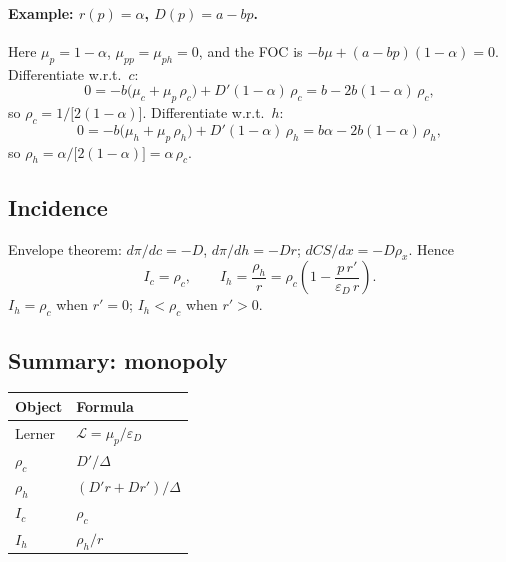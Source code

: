 \documentclass[11pt]{article}
\begin{document}
\paragraph{Example: $r(p)=\alpha$, $D(p)=a-bp$.}
Here $\mu_p=1-\alpha$, $\mu_{pp}=\mu_{ph}=0$, and the FOC is
$-b\mu+(a-bp)(1-\alpha)=0$.  Differentiate w.r.t.\ $c$:
\[
  0 = -b\bigl(\mu_c+\mu_p\,\rho_c\bigr) + D'(1-\alpha)\,\rho_c
  = b - 2b(1-\alpha)\,\rho_c,
\]
so $\rho_c=1/\bigl[2(1-\alpha)\bigr]$.  Differentiate w.r.t.\ $h$:
\[
  0 = -b\bigl(\mu_h+\mu_p\,\rho_h\bigr) + D'(1-\alpha)\,\rho_h
  = b\alpha - 2b(1-\alpha)\,\rho_h,
\]
so $\rho_h=\alpha/\bigl[2(1-\alpha)\bigr]=\alpha\,\rho_c$.

\subsection{Incidence}

Envelope theorem: $d\pi/dc=-D$, $d\pi/dh=-Dr$; $dCS/dx=-D\rho_x$.  Hence
\begin{equation}
  I_c=\rho_c,
  \qquad
  I_h=\frac{\rho_h}{r}
  = \rho_c\!\left(1-\frac{p\,r'}{\varepsilon_D\,r}\right).
  \label{eq:mono-incidence}
\end{equation}
$I_h=\rho_c$ when $r'=0$; $I_h<\rho_c$ when $r'>0$.
\subsection{Summary: monopoly}

\begin{center}
\begin{tabular}{ll}
  \hline
  Object & Formula \\
  \hline
  Lerner & $\mathcal{L}=\mu_p/\varepsilon_D$ \\
  $\rho_c$ & $D'/\Delta$ \\
  $\rho_h$ & $(D'r+Dr')/\Delta$ \\
  $I_c$ & $\rho_c$ \\
  $I_h$ & $\rho_h/r$ \\
  \hline
\end{tabular}
\end{center}

\end{document}
